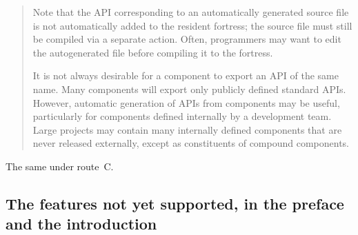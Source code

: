 \begin{description}
\begin{quote}
Note that the API corresponding to an automatically generated source
file is not automatically added to the resident fortress; the source
file must still be compiled via a separate action. Often, programmers
may want to edit the autogenerated file before compiling it to the
fortress.

It is not always desirable for a component to export an API of the same name.
Many components will export only publicly defined standard APIs.
However, automatic generation of APIs from components may be useful,
particularly for components defined internally by a development team.
Large projects may contain many internally defined components that
are never released externally,
except as constituents of compound components.
\end{quote}
\item[Route C] The same under route~C.
\end{description}

\subsection{The features not yet supported, in the preface and the introduction}

